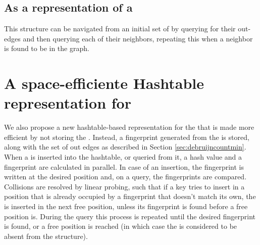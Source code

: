 \subsection{As a representation of a \dBG}

 This structure can be navigated from
an initial set of \kmers by querying for their out-edges and then querying each of their neighbors, repeating this when a neighbor is
found to be in the graph. 


\section{A space-efficiente Hashtable representation for }
\label{sec:debruijnhashtable}

We also propose a new hashtable-based representation for the \dBG that is made more efficient by not storing the \kmer. Instead,
a fingerprint generated from the \kmer is stored, along with the set of out edges as described in Section \ref{sec:debruijncountmin}.
When a \kmer is inserted into the hashtable, or queried from it, a hash value and a fingerprint are calculated in parallel.
In case of an insertion, the fingerprint is written at the desired position and, on a query, the fingerprints are compared. Collisions
are resolved by linear probing, such that if a key tries to insert in a position that is already occupied by a fingerprint that doesn't 
match its own, the \kmer is inserted in the next free position, unless its fingerprint is found before a free position is. During the
query this process is repeated until the desired fingerprint is found, or a free position is reached (in which case the \kmer is
considered to be absent from the structure).

